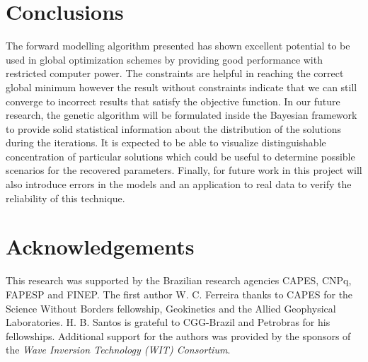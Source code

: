 \documentclass{vie16}
\begin{document}
\begin{table}[h!]
\end{table}

\section{Conclusions}
The forward modelling algorithm presented has shown excellent
potential to be used in global optimization schemes by providing
good performance with restricted computer power. The constraints
are helpful in reaching the correct global minimum however the
result without constraints indicate that we can still converge
to incorrect results that satisfy the objective function. In our
future research, the genetic algorithm will be formulated inside
the Bayesian framework to provide solid statistical information
about the distribution of the solutions during the iterations.
It is expected to be able to visualize distinguishable
concentration of particular solutions which could be useful to
determine possible scenarios for the recovered parameters.
Finally, for future work in this project will also introduce
errors in the models and an application to real data to verify
the reliability of this technique.

\section{Acknowledgements}
This research was supported by the Brazilian research agencies CAPES, CNPq, 
FAPESP and FINEP. The first author W. C. Ferreira thanks to CAPES for the 
Science Without Borders fellowship, Geokinetics and the Allied Geophysical 
Laboratories. H. B. Santos is grateful to CGG-Brazil and Petrobras for his 
fellowships. Additional support for the authors was provided by the 
sponsors of the \textit{Wave Inversion Technology (WIT) Consortium}.


\end{document}
